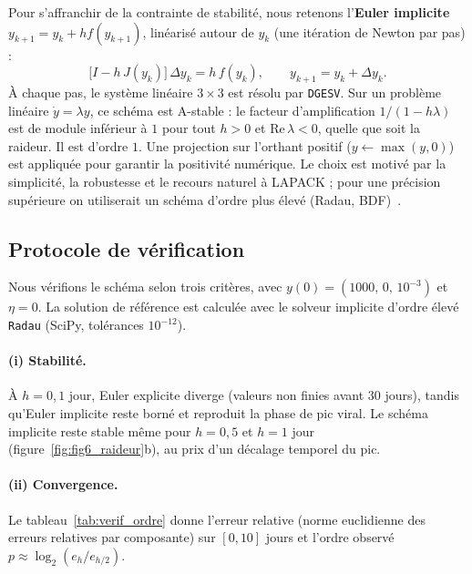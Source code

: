 \documentclass[11pt,a4paper]{report}
\theoremstyle{plain}
\theoremstyle{definition}
\theoremstyle{remark}
\begin{document}
Pour s'affranchir de la contrainte de stabilité, nous retenons l'\textbf{Euler implicite} $y_{k+1}=y_k+hf(y_{k+1})$, linéarisé autour de $y_k$ (une itération de Newton par pas) :
\begin{equation}
\big[I-h\,J(y_k)\big]\,\Delta y_k=h\,f(y_k),\qquad y_{k+1}=y_k+\Delta y_k .
\label{eq:euler_implicite}
\end{equation}
À chaque pas, le système linéaire $3\times3$ est résolu par \texttt{DGESV}. Sur un problème linéaire $\dot y=\lambda y$, ce schéma est A-stable : le facteur d'amplification $1/(1-h\lambda)$ est de module inférieur à $1$ pour tout $h>0$ et $\mathrm{Re}\,\lambda<0$, quelle que soit la raideur. Il est d'ordre $1$. Une projection sur l'orthant positif ($y\leftarrow\max(y,0)$) est appliquée pour garantir la positivité numérique. Le choix est motivé par la simplicité, la robustesse et le recours naturel à LAPACK ; pour une précision supérieure on utiliserait un schéma d'ordre plus élevé (Radau, BDF)~\cite{hairer1996}.

\subsection*{Protocole de vérification}

Nous vérifions le schéma selon trois critères, avec $y(0)=(1000,\,0,\,10^{-3})$ et $\eta=0$. La solution de référence est calculée avec le solveur implicite d'ordre élevé \texttt{Radau} (SciPy, tolérances $10^{-12}$).

\paragraph{(i) Stabilité.} À $h=0{,}1$ jour, Euler explicite diverge (valeurs non finies avant $30$ jours), tandis qu'Euler implicite reste borné et reproduit la phase de pic viral. Le schéma implicite reste stable même pour $h=0{,}5$ et $h=1$ jour (figure~\ref{fig:fig6_raideur}b), au prix d'un décalage temporel du pic.

\paragraph{(ii) Convergence.} Le tableau~\ref{tab:verif_ordre} donne l'erreur relative (norme euclidienne des erreurs relatives par composante) sur $[0,10]$ jours et l'ordre observé $p\approx\log_2(e_h/e_{h/2})$.
\end{document}
